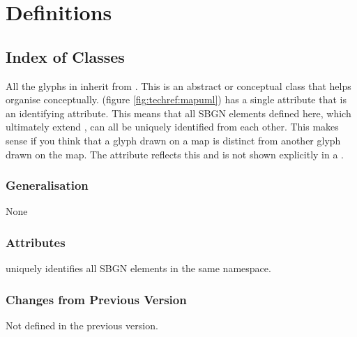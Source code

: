 \section{Definitions}
\label{sec:techref:definitions}

\subsection{Index of Classes}

\printindex

\label{defn:SBGNElement}

All the glyphs in \SBGNPDLone inherit from
. This is an abstract or conceptual class that
helps organise \PD conceptually.  (figure
\ref{fig:techref:mapuml}) has a single attribute  that is an
identifying attribute. This means that all SBGN elements defined here,
which ultimately extend , can all be uniquely
identified from each other. This makes sense if you think that a glyph
drawn on a map is distinct from another glyph drawn on the map. The
 attribute reflects this and is not shown explicitly in a
\PDm.

\subsubsection{Generalisation}

None

\subsubsection{Attributes}

\begin{attributes}
   uniquely identifies all SBGN elements in
  the same namespace.
\end{attributes}

\subsubsection{Changes from Previous Version}

Not defined in the previous version.

\label{defn:Map}\label{sec:techref:map}



